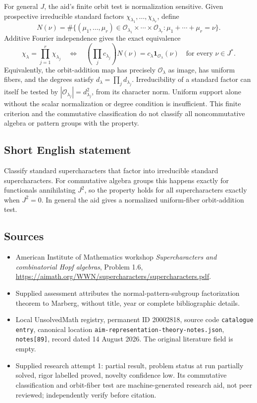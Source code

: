 \documentclass[11pt]{article}
\begin{document}
For general $J$, the aid's finite orbit test is normalization sensitive. Given prospective irreducible standard factors $\chi_{\lambda_1},\ldots,\chi_{\lambda_r}$, define
\[
 N(\nu)=\#\{(\mu_1,\ldots,\mu_r)\in
           \mathcal O_{\lambda_1}\times\cdots\times\mathcal O_{\lambda_r}:
                 \mu_1+\cdots+\mu_r=\nu\}.
\]
Additive Fourier independence gives the exact equivalence
\[
 \chi_\lambda=\prod_{j=1}^r\chi_{\lambda_j}
 \quad\Longleftrightarrow\quad
 \left(\prod_jc_{\lambda_j}\right)N(\nu)
           =c_\lambda\mathbf1_{\mathcal O_\lambda}(\nu)
 \quad\text{for every }\nu\in J^*.
\]
Equivalently, the orbit-addition map has precisely $\mathcal O_\lambda$ as image, has uniform fibers, and the degrees satisfy $d_\lambda=\prod_jd_{\lambda_j}$. Irreducibility of a standard factor can itself be tested by $|\mathcal O_{\lambda_j}|=d_{\lambda_j}^2$, from its character norm. Uniform support alone without the scalar normalization or degree condition is insufficient. This finite criterion and the commutative classification do not classify all noncommutative algebra or pattern groups with the property.
\subsection{Short English statement}
Classify standard supercharacters that factor into irreducible standard supercharacters. For commutative algebra groups this happens exactly for functionals annihilating $J^2$, so the property holds for all supercharacters exactly when $J^2=0$. In general the aid gives a normalized uniform-fiber orbit-addition test.
\subsection{Sources}
\begin{itemize}
\item American Institute of Mathematics workshop \emph{Supercharacters and combinatorial Hopf algebras}, Problem 1.6, \url{https://aimath.org/WWN/supercharacters/supercharacters.pdf}.
\item Supplied assessment attributes the normal-pattern-subgroup factorization theorem to Marberg, without title, year or complete bibliographic details.
\item Local UnsolvedMath registry, permanent ID 20002818, source code \texttt{catalogue entry}, canonical location \texttt{aim-representation-theory-notes.json}, \texttt{notes[89]}, record dated 14 August 2026. The original literature field is empty.
\item Supplied research attempt 1: partial result, problem status at run partially solved, rigor labelled proved, novelty confidence low. Its commutative classification and orbit-fiber test are machine-generated research aid, not peer reviewed; independently verify before citation.
\end{itemize}
\end{document}

